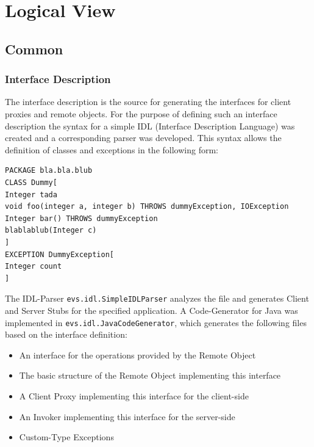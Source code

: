 \section{Logical View}


\subsection{Common}

\subsubsection{Interface Description}
The interface description is the source for generating the interfaces for client proxies and remote objects. For the purpose of defining such an interface description the syntax for a simple IDL (Interface Description Language) was created and a corresponding parser was developed. This syntax allows the definition of classes and exceptions in the following form:

\begin{code}
\begin{verbatim}
PACKAGE bla.bla.blub
CLASS Dummy[
Integer tada
void foo(integer a, integer b) THROWS dummyException, IOException
Integer bar() THROWS dummyException
blablablub(Integer c)
]
EXCEPTION DummyException[
Integer count
]
\end{verbatim}
\end{code}

The IDL-Parser \texttt{evs.idl.SimpleIDLParser} analyzes the file and generates Client and Server Stubs for the specified application. A Code-Generator for Java was implemented in \texttt{evs.idl.JavaCodeGenerator}, which generates the following files based on the interface definition:

\begin{itemize}\itemsep0pt
\item An interface for the operations provided by the Remote Object
\item The basic structure of the Remote Object implementing this interface
\item A Client Proxy implementing this interface for the client-side
\item An Invoker implementing this interface for the server-side
\item Custom-Type Exceptions
\end{itemize}

